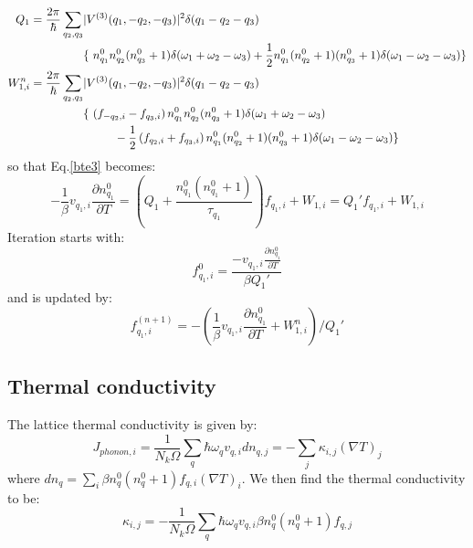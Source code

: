 \documentclass{article}
\newcommand{\pfrac}[2]{\frac{\partial #1}{\partial #2}}
\begin{document}
\begin{align}
    Q_1 = \frac{2\pi}{\hbar} \sum_{q_2,q_3} & |V^{(3)}(q_1, -q_2, -q_3)|^2 \delta(q_1 - q_2 - q_3) \notag \\ 
    & \{\  n_{q_1}^0 n_{q_2}^0 (n_{q_3}^0 + 1) \delta(\omega_1 + \omega_2 - \omega_3) + \frac{1}{2} n_{q_1}^0 (n_{q_2}^0+1) (n_{q_3}^0 + 1) \delta(\omega_1 - \omega_2 - \omega_3) \} \\
    W_{1,i}^n = \frac{2\pi}{\hbar} \sum_{q_2,q_3} & |V^{(3)}(q_1, -q_2, -q_3)|^2 \delta(q_1 - q_2 - q_3) \notag \\ 
    & \{\ \left(f_{-q_2,i} - f_{q_3,i} \right)  n_{q_1}^0 n_{q_2}^0 (n_{q_3}^0 + 1) \delta(\omega_1 + \omega_2 - \omega_3) \notag \\
    & \ \ \ \ \ \ \ \ -\frac{1}{2} \left( f_{q_2,i} + f_{q_3,i} \right) n_{q_1}^0 (n_{q_2}^0+1) (n_{q_3}^0 + 1) \delta(\omega_1 - \omega_2 - \omega_3) \}
\end{align}
so that Eq.\ref{bte3} becomes:
\begin{equation}
    - \frac{1}{\beta} v_{q_1,i} \pfrac{n_{q_1}^0}{T} = \left( Q_1 + \frac{n_{q_1}^0(n_{q_1}^0+1)}{\tau_{q_1}} \right) f_{q_1,i} + W_{1,i} = Q_1' f_{q_1,i} + W_{1,i} 
\end{equation}
Iteration starts with:
\begin{equation}
    f_{q_1,i}^0 = \frac{-v_{q_1,i} \pfrac{n_{q_1}^0}{T}}{\beta Q_1'}
\end{equation}
and is updated by:
\begin{equation}
    f_{q_1,i}^{(n+1)} = - ( \frac{1}{\beta} v_{q_1,i} \pfrac{n_{q_1}^0}{T} + W_{1,i}^{n} ) / Q_1'
\end{equation}

\subsection{Thermal conductivity}
The lattice thermal conductivity is given by:
\begin{equation}
    J_{phonon,i} = \frac{1}{N_k \Omega}\sum_q \hbar \omega_q v_{q,i} dn_{q,j} = -\sum_j \kappa_{i,j} \left( \nabla T \right)_j \label{jp} 
\end{equation}
where $dn_q = \sum_i \beta n_q^0(n_q^0+1)f_{q,i} \left( \nabla T \right)_i $. We then find the thermal conductivity to be:
\begin{equation}
    \kappa_{i,j} = -\frac{1}{N_k \Omega}\sum_q \hbar \omega_q v_{q,i} \beta n_q^0(n_q^0+1)f_{q,j}
\end{equation}
\end{document}
